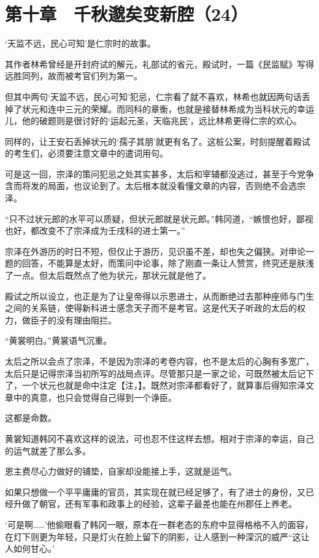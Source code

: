 \section{第十章　千秋邈矣变新腔（24）}

‘天监不远，民心可知’是仁宗时的故事。

其作者林希曾经是开封府试的解元，礼部试的省元，殿试时，一篇《民监赋》写得远胜同列，故而被考官们列为第一。

但其中两句‘天监不远，民心可知’犯忌，仁宗看了就不喜欢，林希也就因两句话丢掉了状元和连中三元的荣耀。而同科的章衡，也就是接替林希成为当科状元的幸运儿，他的破题则是很讨好的‘运起元圣，天临兆民’，远比林希更得仁宗的欢心。

同样的，让王安石丢掉状元的‘孺子其朋’就更有名了。这桩公案，时刻提醒着殿试的考生们，必须要注意文章中的遣词用句。

可是这一回，宗泽的策问犯忌之处其实甚多，太后和宰辅都没逃过，甚至于今党争含而将发的局面，也议论到了。太后根本就没看懂文章的内容，否则绝不会选宗泽。

“只不过状元郎的水平可以质疑，但状元郎就是状元郎。”韩冈道，“嫉恨也好，鄙视也好，都改变不了宗泽成为壬戌科的进士第一。”

宗泽在外游历的时日不短，但仅止于游历，见识虽不差，却也失之偏狭。对申论一题的回答，不能算是太好，而策问中论事，除了刚直一条让人赞赏，终究还是肤浅了一点。但太后既然点了他为状元，那状元就是他了。

殿试之所以设立，也正是为了让皇帝得以示恩进士，从而断绝过去那种座师与门生之间的关系链，使得新科进士感念天子而不是考官。这是代天子听政的太后的权力，做臣子的没有理由阻拦。

“黄裳明白。”黄裳语气沉重。

太后之所以会点了宗泽，不是因为宗泽的考卷内容，也不是太后的心胸有多宽广，太后只是记得宗泽当初所写的战局点评。尽管那只是一家之论，可既然被太后记下了，一个状元也就是命中注定【注，】。既然对宗泽都看好了，就算事后得知宗泽文章中的真意，也只会觉得自己得到一个诤臣。

这都是命数。

黄裳知道韩冈不喜欢这样的说法，可也忍不住这样去想。相对于宗泽的幸运，自己的运气就差了那么多。

恩主费尽心力做好的铺垫，自家却没能接上手，这就是运气。

如果只想做一个平平庸庸的官员，其实现在就已经足够了，有了进士的身份，又已经升做了朝官，还有军事和政事上的经验，这辈子最差也能在州郡任上养老。

‘可是啊……’他偷眼看了韩冈一眼，原本在一群老态的东府中显得格格不入的面容，在灯下则更为年轻，只是灯火在脸上留下的阴影，让人感到一种深沉的威严“这让人如何甘心。’


